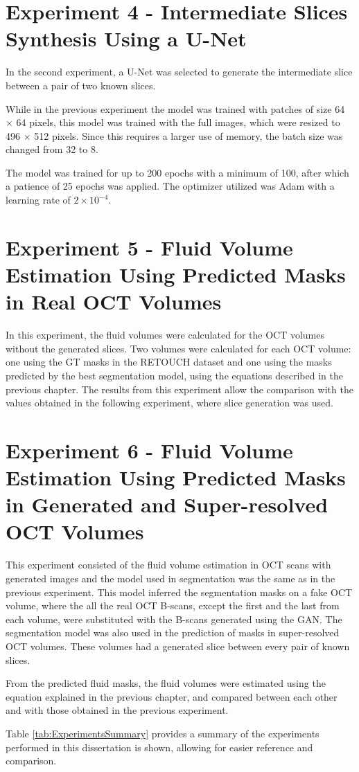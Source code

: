 \section{Experiment 4 - Intermediate Slices Synthesis Using a U-Net}
In the second experiment, a U-Net was selected to generate the intermediate slice between a pair of two known slices. 
\par
While in the previous experiment the model was trained with patches of size 64 $\times$ 64 pixels, this model was trained with the full images, which were resized to 496 $\times$ 512 pixels. Since this requires a larger use of memory, the batch size was changed from 32 to 8.
\par
The model was trained for up to 200 epochs with a minimum of 100, after which a patience of 25 epochs was applied. The optimizer utilized was Adam with a learning rate of $2 \times 10^{-4}$.

\section{Experiment 5 - Fluid Volume Estimation Using Predicted Masks in Real OCT Volumes}

In this experiment, the fluid volumes were calculated for the OCT volumes without the generated slices. Two volumes were calculated for each OCT volume: one using the GT masks in the RETOUCH dataset and one using the masks predicted by the best segmentation model, using the equations described in the previous chapter. The results from this experiment allow the comparison with the values obtained in the following experiment, where slice generation was used.

\section{Experiment 6 - Fluid Volume Estimation Using Predicted Masks in Generated and Super-resolved OCT Volumes}

This experiment consisted of the fluid volume estimation in OCT scans with generated images and the model used in segmentation was the same as in the previous experiment. This model inferred the segmentation masks on a fake OCT volume, where the all the real OCT B-scans, except the first and the last from each volume, were substituted with the B-scans generated using the GAN. The segmentation model was also used in the prediction of masks in super-resolved OCT volumes. These volumes had a generated slice between every pair of known slices.
\par
From the predicted fluid masks, the fluid volumes were estimated using the equation explained in the previous chapter, and compared between each other and with those obtained in the previous experiment.
\par
Table \ref{tab:ExperimentsSummary} provides a summary of the experiments performed in this dissertation is shown, allowing for easier reference and comparison.

